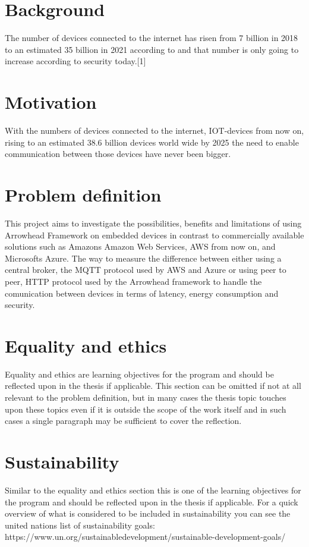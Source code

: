 \section{Background}
The number of devices connected to the internet has risen from 7 billion in 2018 to an estimated 35 billion in 2021 according to and that number is only going to increase
according to security today.[1] %
\section{Motivation}
With the numbers of devices connected to the internet, IOT-devices 
from now on, rising to an estimated 38.6 billion devices world wide
by 2025 the need to enable communication between those devices have
never been bigger.


\section{Problem definition}
This project aims to investigate the possibilities, benefits and 
limitations of using Arrowhead Framework on embedded devices
in contrast to commercially available solutions such 
as Amazons Amazon Web Services, AWS 
from now on, and Microsofts Azure.  
The way to measure the difference between either 
using a central broker, the MQTT protocol used by AWS and Azure or using peer to peer, 
HTTP protocol used by the Arrowhead framework to handle the comunication between devices in terms of latency, 
energy consumption and
security.

\section{Equality and ethics}
Equality and ethics are learning objectives for the program and should be reflected upon in the thesis if applicable. This section can be omitted if not at all relevant to the problem definition, but in many cases the thesis topic touches upon these topics even if it is outside the scope of the work itself and in such cases a single paragraph may be sufficient to cover the reflection.
\section{Sustainability}
Similar to the equality and ethics section this is one of the learning objectives for the program and should be reflected upon in the thesis if applicable. For a quick overview of what is considered to be included in sustainability you can see the united nations list of sustainability goals: https://www.un.org/sustainabledevelopment/sustainable-development-goals/

